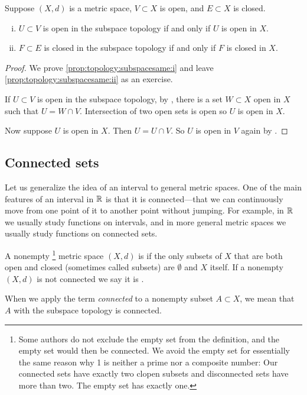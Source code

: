 \begin{prop} \label{prop:topology:subspacesame}
Suppose $(X,d)$ is a metric space, $V \subset X$ is open,
and $E \subset X$ is closed.
\begin{enumerate}[(i)]
\item \label{prop:topology:subspacesame:i}
$U \subset V$ is open in the subspace topology if and only if $U$ is open
in $X$.
\item \label{prop:topology:subspacesame:ii}
$F \subset E$ is closed in the subspace topology if and only if $F$ is
closed in $X$.
\end{enumerate}
\end{prop}

\begin{proof}
We prove
\ref{prop:topology:subspacesame:i}
and leave 
\ref{prop:topology:subspacesame:ii} as an exercise.

If $U \subset V$ is open in the subspace topology, by
, there is a set $W \subset X$
open in $X$ such that $U = W \cap V$.  Intersection of two open sets
is open so $U$ is open in $X$.

Now suppose $U$ is open in $X$.  Then $U = U \cap V$. So
$U$ is open in $V$ again by .
\end{proof}

\subsection{Connected sets}

Let us generalize the idea of an interval to general metric spaces.  One of
the main features of an interval in ${\mathbb{R}}$ is that it is
connected---that we can continuously move from one point of it to
another point without jumping.
For example, in ${\mathbb{R}}$ we usually study functions on intervals,
and in more general metric spaces we usually study functions on connected sets.

\begin{defn}
A nonempty%
\footnote{Some authors do not exclude the empty set from the definition,
and the empty set would then be connected.
We avoid the empty set for essentially the same reason why
1 is neither a prime nor a composite number:  Our connected sets have exactly
two clopen subsets and disconnected sets have more than two.  The empty set
has exactly one.}
metric space $(X,d)$ is \emph{} if the
only subsets of $X$ that are both open and closed (sometimes called
\emph{} subsets) are $\emptyset$ and $X$ itself.
If a nonempty $(X,d)$ is not connected we say it is
\emph{}.

When we apply the term \emph{connected} to a nonempty subset $A \subset X$, we 
mean that $A$ with the subspace topology is connected.
\end{defn}

